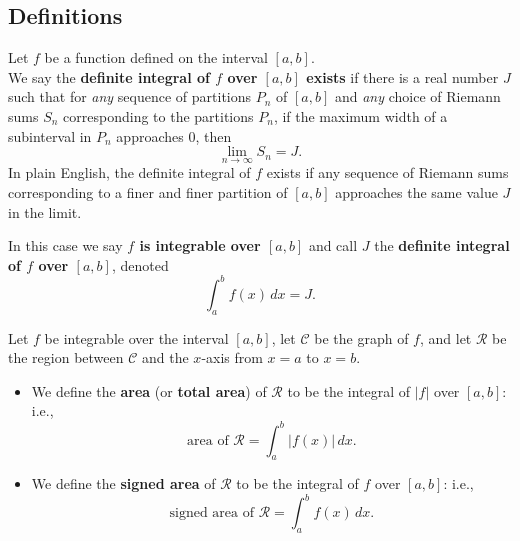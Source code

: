 \subsection*{Definitions}
\begin{namedtheorem} Let $f$ be a function defined on the interval $[a,b]$. \\
  We say the {\bf definite integral of $f$ over $[a,b]$ exists} if there is a real number $J$ such that for {\em any} sequence of partitions $P_n$ of $[a,b]$ and {\em any} choice of Riemann sums $S_n$ corresponding to the partitions $P_n$, if the maximum width of a subinterval in $P_n$ approaches 0, then
  \[
  \lim_{n\to\infty} S_n=J.
  \]
In plain English, the definite integral of $f$ exists if any sequence of Riemann sums corresponding to a finer and finer partition of $[a,b]$ approaches the same value $J$ in the limit.

In this case we say {\bf $f$ is integrable over $[a,b]$} and call $J$ the {\bf definite integral of $f$ over $[a,b]$}, denoted
\[
\int_a^bf(x)\, dx=J.
\]
\end{namedtheorem}
\begin{namedtheorem} Let $f$ be integrable over the interval $[a,b]$, let $\mathcal{C}$ be the graph of $f$, and let $\mathcal{R}$ be the region between $\mathcal{C}$ and the $x$-axis from $x=a$ to $x=b$.
\begin{itemize}
  \item We define the {\bf area} (or {\bf total area}) of $\mathcal{R}$ to be the integral of $\lvert f\rvert$ over $[a,b]$: i.e.,
  \[
  \text{area of $\mathcal{R}$}=\int_a^b\lvert f(x)\rvert\, dx.
  \]
  \item We define the {\bf signed area} of $\mathcal{R}$ to be the integral of $f$ over $[a,b]$: i.e.,
  \[
  \text{signed area of $\mathcal{R}$}=\int_a^b f(x)\, dx.
  \]
\end{itemize}


\end{namedtheorem}
\begin{comment}
  Let $f$ be integrable over the interval $[a,b]$, let $\mathcal{C}$ be the graph of $f$, and let $\mathcal{R}$ be the region between $\mathcal{C}$ and the $x$-axis from $x=a$ to $x=b$.
\begin{enumerate}
  \item The area of $\mathcal{R}$ is always nonnegative, since $\lvert f(x)\rvert\geq 0$ for all $x\in [a,b]$.
  \item If $f(x)\geq 0$ for all $x\in [a,b]$, then $f=\lvert f\rvert$ over $[a,b]$, and hence
  \[
  \text{area of $\mathcal{R}$}=\int_a^b f(x)\, dx
  \]
  in this case.
  \item Suppose $[a,b]$ can be partitioned into finitely many intervals over which $f$ is either always nonnegative ($\geq 0$) or always nonpositive ($\leq 0$). Then
  \[
  \text{signed area of $\mathcal{R}$}=\int_a^b f(x)\, dx=(\text{area of regions where $f\geq 0$})-(\text{area of regions where $f\leq 0$}).
  \]
\end{enumerate}
\end{comment}

